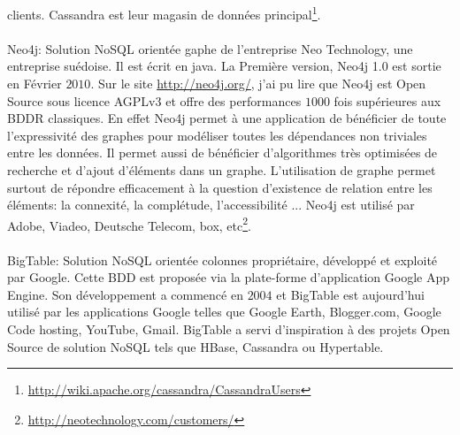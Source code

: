 clients. \textsf{Cassandra} est leur magasin de données
principal\footnote{\url{http://wiki.apache.org/cassandra/CassandraUsers}}.
\\
\\
\textsf{Neo4j}:  Solution \textsf{NoSQL} orientée 
\textsf{gaphe} de l'entreprise \textsf{Neo Technology}, une entreprise suédoise\cite{MichaelFiguiereNeo4j}. Il est écrit en java\cite{GavinTerrill}. La Première version, \textsf{Neo4j 1.0} est sortie en Février $2010$\cite{Neo4jBlog}. 
Sur le site \url{http://neo4j.org/}, j'ai pu lire que \textsf{Neo4j} est \textsf{Open Source} sous licence \textsf{AGPLv3}  et offre des performances $1000$ fois supérieures aux \textsf{BDDR} classiques. En effet \textsf{Neo4j} permet à une application de bénéficier de toute l'expressivité des graphes pour modéliser toutes les dépendances non triviales
entre les données. Il permet aussi de bénéficier d'algorithmes très optimisées de recherche et d'ajout d'éléments dans un graphe. L'utilisation de graphe permet surtout de répondre efficacement à la question d'existence de relation entre les éléments: la connexité, la complétude, l'accessibilité ... \textsf{Neo4j} est utilisé par \textsf{Adobe, Viadeo, Deutsche Telecom, box, etc}\footnote{\url{http://neotechnology.com/customers/}}.  
\\
\\
\textsf{BigTable}:  Solution \textsf{NoSQL} orientée 
\textsf{colonnes} propriétaire, développé et exploité par Google. Cette 
\textsf{BDD} est proposée via la plate-forme d'application 
\textsf{Google App Engine}. Son
développement a commencé en $2004$ et \textsf{BigTable} est aujourd'hui 
utilisé par les
applications \textsf{Google} telles que \textsf{Google Earth},
\textsf{Blogger.com}, \textsf{Google Code hosting}, \textsf{YouTube},
\textsf{Gmail}. \textsf{BigTable} a servi d'inspiration à des projets 
\textsf{Open Source} de solution \textsf{NoSQL} tels que \textsf{HBase},
\textsf{Cassandra} ou \textsf{Hypertable}\cite{RickCattell}.
